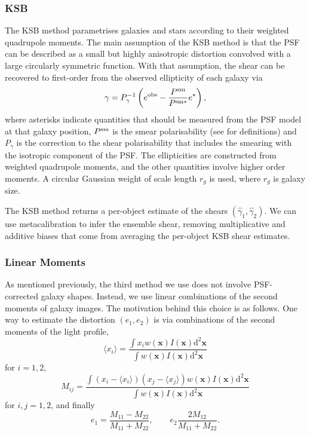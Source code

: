 \documentclass[iop]{emulateapj}
\begin{document}
\subsubsection{KSB}

The KSB method \citep{1995ApJ...449..460K} parametrises galaxies and
stars according to their weighted quadrupole moments.  The main
assumption of the KSB method is that the PSF can be described as a
small but highly anisotropic distortion convolved with a large
circularly symmetric function.  With that assumption, the shear can be
recovered to first-order from the observed ellipticity of each galaxy
via
\begin{equation} \label{eqn:weight}
\gamma=P_{\gamma}^{-1}\left(e^{\rm obs}-\frac{P^{\rm sm}}{P^{\rm sm*}}e^{*}\right),
\end{equation}
where asterisks indicate quantities that should be measured from the
PSF model at that galaxy position, $P^{\rm sm}$ is the smear
polarisability (see \citealt{2006MNRAS.368.1323H} for definitions) and
$P_\gamma$ is the correction to the shear polarisability that includes
the smearing with the isotropic component of the PSF. The
ellipticities are constructed from weighted quadrupole moments, and
the other quantities involve higher order moments. A circular Gaussian
weight of scale length $r_g$ is used, where $r_g$ is galaxy size.

The KSB method returns a per-object estimate of the shears
$(\hat{\gamma}_1, \hat{\gamma}_2)$. We can use metacalibration to
infer the ensemble shear, removing multiplicative and additive biases that come from averaging the
per-object KSB shear estimates.

\subsubsection{Linear Moments}

As mentioned previously, the third method we use does not involve
PSF-corrected galaxy shapes.  Instead, we use linear combinations of
the second moments of galaxy images.  The motivation behind this
choice is as follows.  One way to estimate the distortion $(e_1,e_2)$
is via combinations of the second moments of the light profile,
\begin{equation}
\langle x_i\rangle = \frac{\int x_i w({\mathbf x}) I({\mathbf x}) \mathrm{d}^2{\mathbf x}}{\int w({\mathbf x}) I({\mathbf x}) \mathrm{d}^2{\mathbf x}}
\end{equation}
for $i=1, 2$,
\begin{equation}
M_{ij} = \frac{\int (x_i-\langle x_i\rangle)(x_j-\langle x_j\rangle) w({\mathbf x}) I({\mathbf x}) \mathrm{d}^2{\mathbf x}}{\int w({\mathbf x}) I({\mathbf x}) \mathrm{d}^2{\mathbf x}}
\end{equation}
for $i,j=1,2$, and finally 
\begin{equation}\label{eq:moments-div}
e_1 = \frac{M_{11}-M_{22}}{M_{11}+M_{22}}, \qquad e_2 \frac{2M_{12}}{M_{11}+M_{22}}.
\end{equation}
\end{document}
